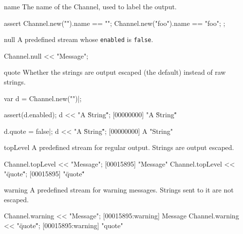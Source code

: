 \begin{urbiscriptapi}
\item[name] The name of the Channel, used to label the output.
\begin{urbiscript}
assert
{
  Channel.new("").name == "";
  Channel.new("foo").name == "foo";
};
\end{urbiscript}


\item[null] A predefined stream whose \lstinline|enabled| is
  \lstinline|false|.
\begin{urbiscript}
Channel.null << "Message";
\end{urbiscript}


\item[quote] Whether the strings are output escaped (the default)
  instead of raw strings.
\begin{urbiscript}
var d = Channel.new("")|;

assert(d.enabled);
d << "A \"String\"";
[00000000] "A \"String\""

d.quote = false|;
d << "A \"String\"";
[00000000] A "String"
\end{urbiscript}


\item[topLevel] A predefined stream for regular output.  Strings are
  output escaped.
\begin{urbiscript}
Channel.topLevel << "Message";
[00015895] "Message"
Channel.topLevel << "\"quote\"";
[00015895] "\"quote\""
\end{urbiscript}


\item[warning] A predefined stream for warning messages.  Strings sent
  to it are not escaped.
\begin{urbiscript}
Channel.warning << "Message";
[00015895:warning] Message
Channel.warning << "\"quote\"";
[00015895:warning] "quote"
\end{urbiscript}
\end{urbiscriptapi}

